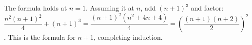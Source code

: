 The formula holds at $n=1$. Assuming it at $n$, add $(n+1)^3$ and factor: $\dfrac{n^2(n+1)^2}{4}+(n+1)^3=\dfrac{(n+1)^2(n^2+4n+4)}{4}=\left(\dfrac{(n+1)(n+2)}{2}\right)^2$. This is the formula for $n+1$, completing induction.
